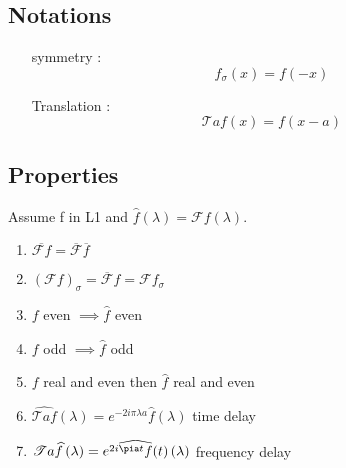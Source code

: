 \subsection{Notations}
\label{subsec:Notations}
\begin{itemize}
    \item[symmetry] : 
        \[
            f _{ \sigma }^{  } (x) = f(-x) 
        \]
    \item[Translation] : 
        \[
        \mathscr{ T } af(x) = f(x-a) 
        \]
\end{itemize}



\subsection{Properties}
\label{subsec:Properties}
Assume f in L1 and $ \widehat{f}\left( \lambda \right) = \mathscr{ F } f(\lambda)  $. 
\begin{enumerate}
    \item $\overline{ \mathscr{ F } f} = \overline{ \mathscr{ F } } \overline{f} $
    \item $\left( \mathscr{ F } f\right) _{\sigma} = \overline{ \mathscr{ F } } f =
        \mathscr{ F } f_{\sigma} $
    \item $ f $ even $ \implies  \widehat{f} $ even 
    \item $ f $ odd $ \implies  \widehat{f} $ odd 
    \item $ f $ real and even then $ \widehat{f}  $ real and even   
    \item $ \widehat{ \mathscr{ T } a f}\left( \lambda \right) = e^{ -2i\pi\lambda a}
        \widehat{f}(\lambda)  $ time delay
    \item $ \mathscr{ T } a \widehat{f}\left( \lambda\right) = \widehat{ e^{ 2i\pia t}f(t)
        }\left( \lambda \right)   $ frequency delay
\end{enumerate}

